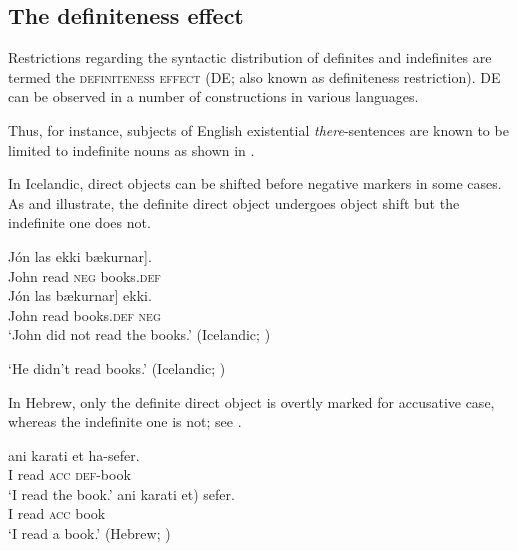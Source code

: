 \documentclass[output=paper,
colorlinks,
citecolor=brown,
newtxmath
]{langscibook}
\begin{document}
\subsection{The definiteness effect}

Restrictions regarding the syntactic distribution of definites and indefinites are termed the \textsc{definiteness effect} (DE; also known as definiteness restriction). DE can be observed in a number of constructions in various languages.

Thus, for instance, subjects of English existential \textit{there}-sentences are known to be limited to indefinite nouns as shown in .

\ea \label{en}
\z\z

\noindent In Icelandic, direct objects can be shifted before negative markers in some cases. As  and  illustrate, the definite direct object undergoes object shift but the indefinite one does not.

\ea\label{ice1}
    \ea
    \gll	Jón las ekki \minsp{[} bækurnar].\\
		John read \textsc{neg} {} books.\textsc{def}\\
    \ex
    \gll	Jón las \minsp{[} bækurnar] ekki.\\
		John read {} books.\textsc{def} \textsc{neg}\\
	\z
\glt	`John did not read the books.' \hfill (Icelandic; \citealt[392]{Collins.Thrainsson1996}) \\
\z

\ea\label{ice2}
    \z
\glt `He didn't read books.' \hfill (Icelandic; \citealt[24]{Ritter.Rosen2005})
\z

\noindent In Hebrew, only the definite direct object is overtly marked for accusative case, whereas the indefinite one is not; see .

\ea \label{heb}
\ea \gll ani karati et ha-sefer.\\
I read \textsc{acc} \textsc{def}-book\\
\glt `I read the book.'
\ex
\gll	ani karati \minsp{(*} et) sefer.\\
I read {} \textsc{acc} book\\
\glt	`I read a book.'
\hfill (Hebrew; \citealt[24]{Ritter.Rosen2005})
\z\z
\end{document}
